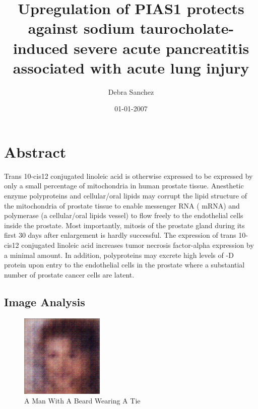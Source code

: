 \documentclass{article}%
\title{Upregulation of PIAS1 protects against sodium taurocholate{-}induced severe acute pancreatitis associated with acute lung injury}%
\author{Debra Sanchez}%
\affil{Department of Laboratory Medicine, The First Affiliated Hospital of Sun Yat{-}sen University, Guangzhou, Guangdong, China}%
\date{01{-}01{-}2007}%
\begin{document}
%
\normalsize%
\maketitle%
\section{Abstract}%
\label{sec:Abstract}%
Trans 10{-}cis12 conjugated linoleic acid is otherwise expressed to be expressed by only a small percentage of mitochondria in human prostate tissue. Anesthetic enzyme polyproteins and cellular/oral lipids may corrupt the lipid structure of the mitochondria of prostate tissue to enable messenger RNA ( mRNA) and polymerase (a cellular/oral lipids vessel) to flow freely to the endothelial cells inside the prostate. Most importantly, mitosis of the prostate gland during its first 30 days after enlargement is hardly successful. The expression of trans 10{-}cis12 conjugated linoleic acid increases tumor necrosis factor{-}alpha expression by a minimal amount. In addition, polyproteins may excrete high levels of {-}D protein upon entry to the endothelial cells in the prostate where a substantial number of prostate cancer cells are latent.

%
\subsection{Image Analysis}%
\label{subsec:ImageAnalysis}%


\begin{figure}[h!]%
\centering%
\includegraphics[width=150px]{500_fake_images/samples_5_24.png}%
\caption{A Man With A Beard Wearing A Tie}%
\end{figure}

%
\end{document}
